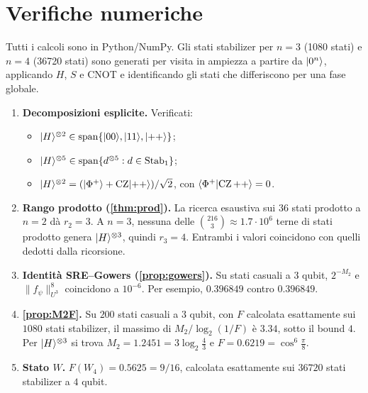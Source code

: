 \section{Verifiche numeriche}\label{app:num}

Tutti i calcoli sono in Python/NumPy. Gli stati stabilizer per $n=3$ (1080 stati) e $n=4$ (36720 stati) sono generati per visita in ampiezza a partire da $\lvert 0^n\rangle$, applicando $H$, $S$ e CNOT e identificando gli stati che differiscono per una fase globale.

\begin{enumerate}[leftmargin=1.5em]
\item \textbf{Decomposizioni esplicite.} Verificati:
\begin{itemize}
\item $\lvert H\rangle^{\otimes2}\in\operatorname{span}\{\lvert 00\rangle,\lvert 11\rangle,\lvert ++\rangle\}$;
\item $\lvert H\rangle^{\otimes5}\in\operatorname{span}\{d^{\otimes5}:d\in\mathrm{Stab}_1\}$;
\item $\lvert H\rangle^{\otimes2}=(\lvert \Phi^+\rangle+\mathrm{CZ}\lvert ++\rangle)/\sqrt2$, con $\langle \Phi^+\vert \mathrm{CZ}\,{+}{+}\rangle=0$.
\end{itemize}

\item \textbf{Rango prodotto (\cref{thm:prod}).} La ricerca esaustiva sui $36$ stati prodotto a $n=2$ dà $r_2=3$. A $n=3$, nessuna delle $\binom{216}{3}\approx1.7\cdot10^6$ terne di stati prodotto genera $\lvert H\rangle^{\otimes3}$, quindi $r_3=4$. Entrambi i valori coincidono con quelli dedotti dalla ricorsione.

\item \textbf{Identità SRE--Gowers (\cref{prop:gowers}).} Su stati casuali a $3$ qubit, $2^{-M_2}$ e $\|f_\psi\|_{U^3}^8$ coincidono a $10^{-6}$. Per esempio, $0.396849$ contro $0.396849$.

\item \textbf{\cref{prop:M2F}.} Su $200$ stati casuali a $3$ qubit, con $F$ calcolata esattamente sui $1080$ stati stabilizer, il massimo di $M_2/\log_2(1/F)$ è $3.34$, sotto il bound $4$. Per $\lvert H\rangle^{\otimes3}$ si trova $M_2=1.2451=3\log_2\frac43$ e $F=0.6219=\cos^6\frac\pi8$.

\item \textbf{Stato $W$.} $F(W_4)=0.5625=9/16$, calcolata esattamente sui $36720$ stati stabilizer a $4$ qubit.


\end{enumerate}
